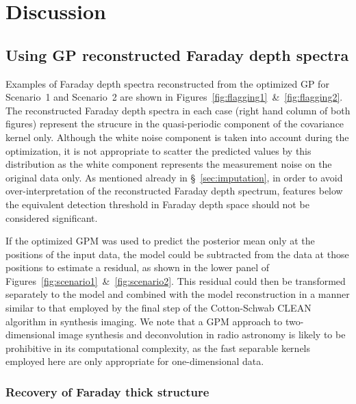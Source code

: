 \documentclass[fleqn,usenatbib]{mnras}
\begin{document}



\section{Discussion}
\label{sec:disc}

\subsection{Using GP reconstructed Faraday depth spectra}
\label{sec:usage}

Examples of Faraday depth spectra reconstructed from the optimized GP for Scenario~1 and Scenario~2 are shown in Figures~\ref{fig:flagging1}~\&~\ref{fig:flagging2}. The reconstructed Faraday depth spectra in each case (right hand column of both figures) represent the strucure in the quasi-periodic component of the covariance kernel only. Although the white noise component is taken into account during the optimization, it is not appropriate to scatter the predicted values by this distribution as the white component represents the measurement noise on the original data only. As mentioned already in \S~\ref{sec:imputation}, in order to avoid over-interpretation of the reconstructed Faraday depth spectrum, features below the equivalent detection threshold in Faraday depth space should not be considered significant.

If the optimized GPM was used to predict the posterior mean only at the positions of the input data, the model could be subtracted from the data at those positions to estimate a residual, as shown in the lower panel of Figures~\ref{fig:scenario1}~\&~\ref{fig:scenario2}. This residual could then be transformed separately to the model and combined with the model reconstruction in a manner similar to that employed by the final step of the Cotton-Schwab CLEAN algorithm in synthesis imaging. We note that a GPM approach to two-dimensional image synthesis and deconvolution in radio astronomy is likely to be prohibitive in its computational complexity, as the fast separable kernels employed here are only appropriate for one-dimensional data.

\subsubsection{Recovery of Faraday thick structure}
\label{sec:thick}
\end{document}
